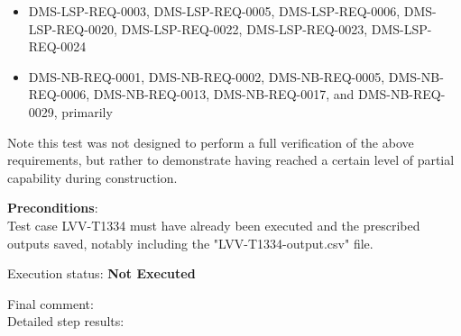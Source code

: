 \documentclass[DM,lsstdraft,STR,toc]{lsstdoc}
\providecommand{\tightlist}{
  \setlength{\itemsep}{0pt}\setlength{\parskip}{0pt}}
\begin{document}
\begin{itemize}
\tightlist
\item
  DMS-LSP-REQ-0003, DMS-LSP-REQ-0005, DMS-LSP-REQ-0006,
  DMS-LSP-REQ-0020, DMS-LSP-REQ-0022, DMS-LSP-REQ-0023, DMS-LSP-REQ-0024
\item
  DMS-NB-REQ-0001, DMS-NB-REQ-0002, DMS-NB-REQ-0005, DMS-NB-REQ-0006,
  DMS-NB-REQ-0013, DMS-NB-REQ-0017, and DMS-NB-REQ-0029, primarily
\end{itemize}

Note this test was not designed to perform a full verification of the
above requirements, but rather to demonstrate having reached a certain
level of partial capability during construction.


    \textbf{ Preconditions}:\\
    Test case LVV-T1334 must have already been executed and the prescribed
outputs saved, notably including the "LVV-T1334-output.csv" file.


    Execution status: {\bf Not Executed }

    Final comment:\\


    Detailed step results:
\end{document}
